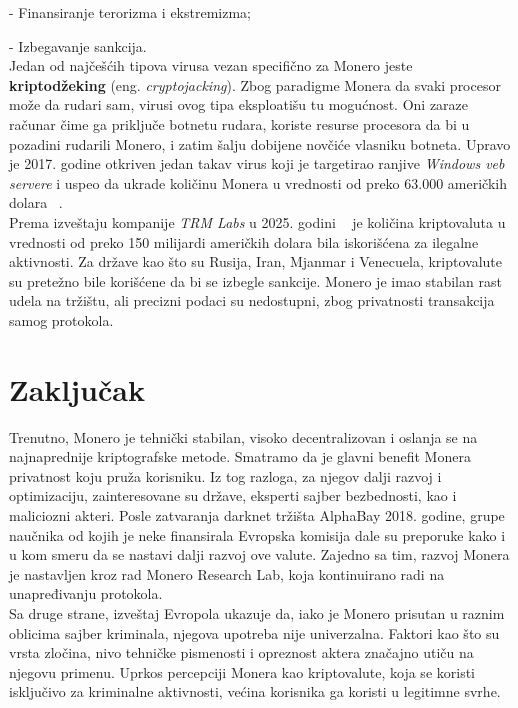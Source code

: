 \documentclass[12pt,a4paper]{article}
\begin{document}
    -	Finansiranje terorizma i ekstremizma; 
    
    -	Izbegavanje sankcija.\\
    
Jedan od najčešćih tipova virusa vezan specifično za Monero jeste \textbf{kriptodžeking} (eng. \textit{cryptojacking}). Zbog paradigme Monera da svaki procesor može da rudari sam, virusi ovog tipa eksploatišu tu mogućnost. Oni zaraze računar čime ga priključe botnetu rudara, koriste resurse procesora da bi u pozadini rudarili Monero, i zatim šalju dobijene novčiće vlasniku botneta. Upravo je 2017. godine otkriven jedan takav virus koji je targetirao ranjive \textit{Windows veb servere} i uspeo da ukrade količinu Monera u vrednosti od preko 63.000 američkih dolara ~\cite{eset}.\\

Prema izveštaju kompanije \textit{TRM Labs} u 2025. godini ~\cite{trmlabs} je količina kriptovaluta u vrednosti od preko 150 milijardi američkih dolara bila iskorišćena za ilegalne aktivnosti. Za države kao što su Rusija, Iran, Mjanmar i Venecuela, kriptovalute su pretežno bile korišćene da bi se izbegle sankcije. Monero je imao stabilan rast udela na tržištu, ali precizni podaci su nedostupni, zbog privatnosti transakcija samog protokola.


\newpage
\section{Zaključak}
Trenutno, Monero je tehnički stabilan, visoko decentralizovan i oslanja se na najnaprednije kriptografske metode.  Smatramo da je glavni benefit Monera privatnost koju pruža korisniku. Iz tog razloga, za njegov dalji razvoj i optimizaciju, zainteresovane su države, eksperti sajber bezbednosti, kao i maliciozni akteri. Posle zatvaranja darknet tržišta AlphaBay 2018. godine, grupe naučnika od kojih je neke finansirala Evropska komisija dale su preporuke kako i u kom smeru da se nastavi dalji razvoj ove valute. Zajedno sa tim, razvoj Monera je nastavljen kroz rad Monero Research Lab, koja kontinuirano radi na unapređivanju protokola.\\

Sa druge strane, izveštaj Evropola ukazuje da, iako je Monero prisutan u raznim oblicima sajber kriminala, njegova upotreba nije univerzalna. Faktori kao što su vrsta zločina, nivo tehničke pismenosti i opreznost aktera značajno utiču na njegovu primenu. Uprkos percepciji Monera kao kriptovalute, koja se koristi isključivo za kriminalne aktivnosti, većina korisnika ga koristi u legitimne svrhe. \\
\end{document}
